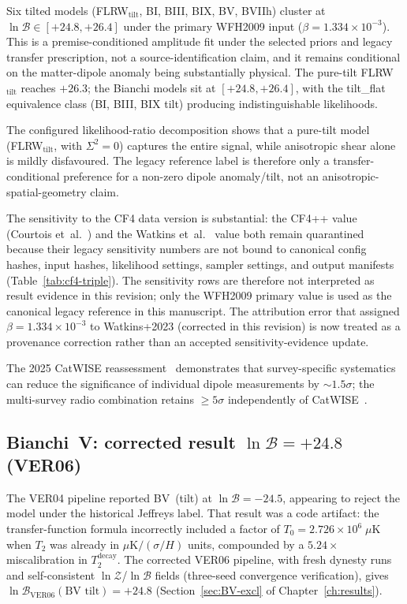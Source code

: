 Six tilted models (FLRW$_{\mathrm{tilt}}$, BI, BIII, BIX,
BV, BVIIh) cluster at
$\ln\mathcal{B} \in [+24.8, +26.4]$ under the primary WFH2009
input ($\beta = 1.334 \times 10^{-3}$).  This is a
premise-conditioned amplitude fit under the selected priors and
legacy transfer prescription, not a source-identification claim,
and it remains conditional on the matter-dipole anomaly being
substantially physical.  The pure-tilt
FLRW$_{\mathrm{tilt}}$ reaches $+26.3$; the Bianchi
models sit at $[+24.8, +26.4]$, with the tilt\_flat
equivalence class (BI, BIII, BIX tilt) producing
indistinguishable likelihoods.

The configured likelihood-ratio decomposition shows that a pure-tilt model
(FLRW$_{\mathrm{tilt}}$, with $\Sigma^2 = 0$) captures the
entire signal, while anisotropic shear alone is mildly
disfavoured.  The legacy reference label is therefore only a
transfer-conditional preference for a non-zero dipole anomaly/tilt,
not an anisotropic-spatial-geometry claim.

The sensitivity to the CF4 data version is substantial:
the CF4++ value (Courtois et~al.~\cite{Courtois2025}) and the
Watkins et~al.~\cite{Watkins2023} value both remain quarantined
because their legacy sensitivity numbers are not bound to canonical
config hashes, input hashes, likelihood settings, sampler settings,
and output manifests (Table~\ref{tab:cf4-triple}).  The sensitivity
rows are therefore not interpreted as result evidence in this revision;
only the WFH2009 primary value is used as the canonical legacy reference
in this manuscript.
The attribution error that assigned
$\beta = 1.334 \times 10^{-3}$ to Watkins+2023 (corrected
in this revision) is now treated as a provenance correction rather
than an accepted sensitivity-evidence update.

The 2025 CatWISE reassessment~\cite{Bashir2025} demonstrates
that survey-specific systematics can reduce the significance
of individual dipole measurements by $\sim\!1.5\sigma$; the
multi-survey radio combination retains $\geq 5\sigma$
independently of CatWISE~\cite{Boehme2025}.


\subsection{Bianchi~V: corrected result $\ln\mathcal{B} = +24.8$ (VER06)}

The VER04 pipeline reported BV~(tilt) at $\ln\mathcal{B} = -24.5$,
appearing to reject the model under the historical Jeffreys label.  That result was
a code artifact: the transfer-function formula incorrectly
included a factor of $T_0 = 2.726 \times 10^6\;\mu\mathrm{K}$
when $T_2$ was already in $\mu\mathrm{K}/(\sigma/H)$ units,
compounded by a $5.24\times$ miscalibration in $T_2^{\mathrm{decay}}$.
The corrected VER06 pipeline, with fresh dynesty runs and
self-consistent $\ln\mathcal{Z}$/$\ln\mathcal{B}$ fields
(three-seed convergence verification), gives
$\ln\mathcal{B}_{\mathrm{VER06}}(\text{BV tilt}) = +24.8$
(Section~\ref{sec:BV-excl} of Chapter~\ref{ch:results}).

